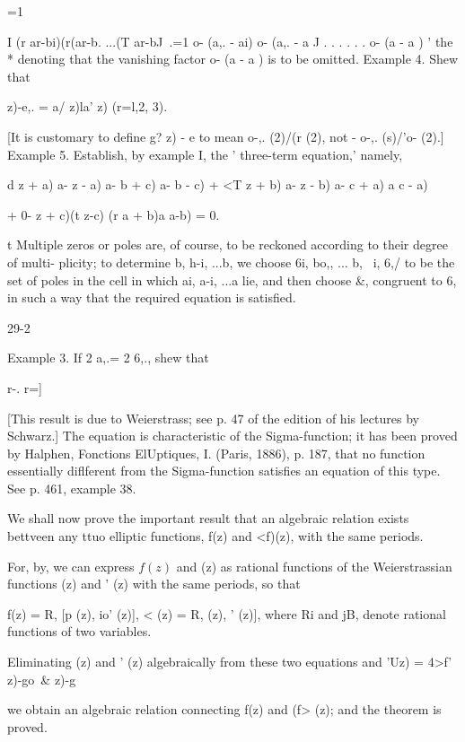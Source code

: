 {=1

I (r ar-bi)(r(ar-b. ...(T ar-bJ \,.=1 o- (a,. - ai) o- (a,. - a J . .
. . . . o- (a - a ) ' the * denoting that the vanishing factor o- (a -
a ) is to be omitted. Example 4. Shew that

  z)-e,. = a/ z)la' z) (r=l,2, 3).

[It is customary to define g? z) - e to mean o-,. (2)/(r (2), not -
o-,. (s)/'o- (2).] Example 5. Establish, by example I, the '
three-term equation,' namely,

d z + a) a- z - a) a- b + c) a- b - c) + <T z + b) a- z - b) a- c + a)
a c - a)

+ 0- z + c)(t z-c) (r a + b)a a-b) = 0.

t Multiple zeros or poles are, of course, to be reckoned according to
their degree of multi- plicity; to determine b, h-i, ...b, we
choose 6i, bo,, ... b, \ i, 6,/ to be the set of poles in the cell
in which ai, a-i, ...a lie, and then choose \&, congruent to 6, in
such a way that the required equation is satisfied.

29-2

Example 3. If 2 a,.= 2 6,., shew that

r-. r=]

%
%

[This result is due to Weierstrass; see p. 47 of the edition of his
lectures by Schwarz.] The equation is characteristic of the
Sigma-function; it has been proved by Halphen, Fonctions ElUptiques,
I. (Paris, 1886), p. 187, that no function essentially diflferent from
the Sigma-function satisfies an equation of this type. See p. 461,
example 38.


We shall now prove the important result that an algebraic relation
exists bettveen any ttuo elliptic functions, f(z) and <f)(z), with the
same periods.

For, by, we can express $f(z)$ and (z) as
rational functions of
the Weierstrassian functions (z) and ' (z) with the same periods, so
that

f(z) = R, [p (z), io' (z)], < (z) = R, (z), ' (z)], where Ri and jB,
denote rational functions of two variables.

Eliminating (z) and ' (z) algebraically from these two equations and
'Uz) = 4>f' z)-go\ \& z)-g

we obtain an algebraic relation connecting f(z) and (f> (z); and the
theorem is proved.

}
